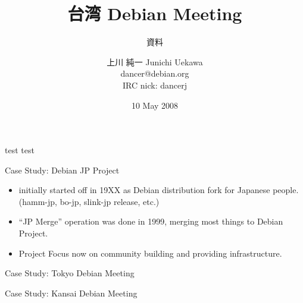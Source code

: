 \documentclass[cjk,dvipdfmx,12pt]{beamer}
\title{台湾 Debian Meeting}
\subtitle{資料}
\author{上川 純一 Junichi Uekawa\\dancer@debian.org\\IRC nick: dancerj}
\date{10 May 2008}
\begin{document}
\frame{\titlepage{}}

\begin{frame}{test}
 test
\end{frame}

\begin{frame}{Case Study: Debian JP Project}
\begin{itemize}
 \item initially started off in 19XX as Debian distribution fork for Japanese
       people. (hamm-jp, bo-jp, slink-jp release, etc.)
 \item ``JP Merge'' operation was done in 1999, merging most things to
       Debian Project.
 \item Project Focus now on community building and providing infrastructure.
\end{itemize}
\end{frame}

\begin{frame}{Case Study: Tokyo Debian Meeting}
\end{frame}

\begin{frame}{Case Study: Kansai Debian Meeting}
\end{frame}
\end{document}
